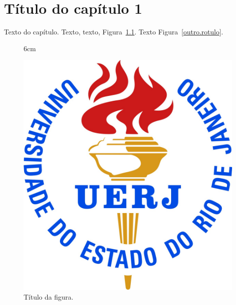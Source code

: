 \documentclass[a4paper,12pt,oneside,onecolumn,final,fleqn]{config/repUERJ}
\begin{document}
\chapter{T\'itulo do cap\'itulo 1}

Texto do capítulo. Texto, texto, Figura~\ref{rotulo}. Texto Figura~\ref{outro.rotulo}.


\begin{figure}[!ht]{6cm}
  \caption{Título da figura.} \label{rotulo}
  \includegraphics[width=\hsize]{images/logo_uerj_cor.jpg}
\end{figure}
\end{document}
